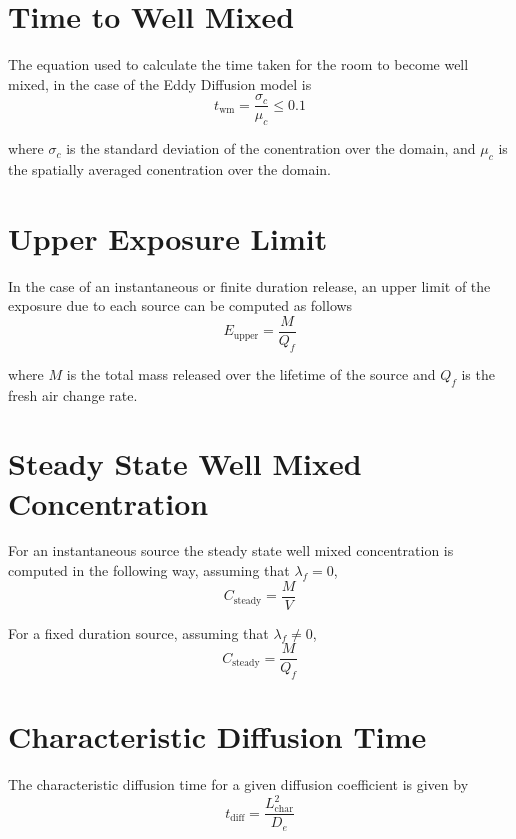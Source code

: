 \documentclass[]{article}
\begin{document}
\section{Time to Well Mixed}\label{app:timetowellmixed}
The equation used to calculate the time taken for the room to become well mixed,
in the case of the Eddy Diffusion model is \cite{drescher95}
\begin{equation}
    t_{\text{wm}}=\frac{\sigma_{c}}{\mu_{c}} \leq 0.1
\end{equation}

\noindent where $\sigma_{c}$ is the standard deviation of the conentration over
the domain, and $\mu_{c}$ is the spatially averaged conentration over the
domain.

\section{Upper Exposure Limit}\label{app:upperexpolimit}
In the case of an instantaneous or finite duration release, an upper limit of
the exposure due to each source can be computed as follows \cite{parker16}
\begin{equation}
    E_{\text{upper}} = \frac{M}{Q_{f}}
\end{equation}

\noindent where $M$ is the total mass released over the lifetime of the source
and $Q_f$ is the fresh air change rate.

\section{Steady State Well Mixed Concentration}\label{app:steadystate}
For an instantaneous source the steady state well mixed concentration is
computed in the following way, assuming that $\lambda_{f} = 0$,
\begin{equation}
    C_{\text{steady}} = \frac{M}{V}
\end{equation}

\noindent For a fixed duration source, assuming that $\lambda_{f}\neq 0$, 
\begin{equation}
    C_{\text{steady}} = \frac{M}{Q_{f}}
\end{equation}

\section{Characteristic Diffusion Time}\label{app:chardifftime}
The characteristic diffusion time for a given diffusion coefficient is given by 
\begin{equation}
    t_{\text{diff}} = \frac{L_{\text{char}}^{2}}{D_{e}}
\end{equation}
\end{document}
